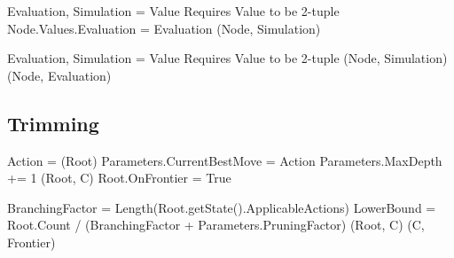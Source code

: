 \begin{algorithm}[H]
    \begin{algorithmic}[1]
            \State Evaluation, Simulation = Value
            \Comment Requires Value to be 2-tuple
            \State Node.Values.Evaluation = Evaluation
            \State {}(Node, Simulation)
        \EndProcedure
    \end{algorithmic}    
\end{algorithm}

\begin{algorithm}[H]
    \begin{algorithmic}[1]
            \State Evaluation, Simulation = Value
            \Comment Requires Value to be 2-tuple
            \State {}(Node, Simulation)
            \State {}(Node, Evaluation)
        \EndProcedure
    \end{algorithmic}    
\end{algorithm}

\newpage
\subsection*{Trimming}

\begin{algorithm}[H]
    \begin{algorithmic}[1]
            \State Action = (Root)
            \State Parameters.CurrentBestMove = Action
            \State Parameters.MaxDepth += 1
                (Root, C)
            \EndFor
            \State Root.OnFrontier = True
        \EndProcedure
    \end{algorithmic}    
\end{algorithm}

\begin{algorithm}[H]
    \begin{algorithmic}[1]
            \State BranchingFactor = Length(Root.getState().ApplicableActions)
            \State LowerBound = Root.Count / (BranchingFactor + Parameters.PruningFactor) 
                    \State {}(Root, C)
                    \State {}(C, Frontier)
                \EndIf
            \EndFor
            
        \EndProcedure
    \end{algorithmic}    
\end{algorithm}


